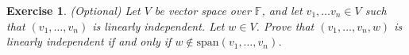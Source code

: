 \documentclass{article}
\theoremstyle{plain}
\newtheorem{Q}{Exercise}{\bfseries}{\upshape}
\newcommand{\bF}{\mathbb{F}}
\newcommand{\spa}{\mathrm{span}}
\begin{document}
\begin{Q}(Optional)
Let $V$ be vector space over $\bF$, and let $v_1,\ldots v_n\in V$ such that $(v_1,\ldots,v_n)$ is linearly independent. Let $w\in V$. Prove that $(v_1,\ldots,v_n, w)$ is linearly independent if and only if $w\not\in \spa(v_1,\ldots,v_n)$.
\end{Q}
\begin{comment}
\textbf{Solution:}
If $w\in \spa(v_1,\ldots,v_n)$, then $w = a_1v_1+\ldots +a_n v_n$ for some $a_1,\ldots,a_n$, and so $0 = (-1)w + a_1v_1+\ldots +a_n v_n$, and so $(v_1,\ldots,v_n, w)$ is not linearly independent. Conversely, if $(v_1,\ldots,v_n, w)$ is not linearly independent then we have $a_0w + a_1v_1+\ldots + a_n v_n = 0$ for some $a_0,\ldots, a_n$ not all zero, and $a_0$ cannot be zero, as $(v_1,\ldots,v_n)$ is linearly independent. So $w = \frac{-a_1}{a_0}v_1 + \ldots + \frac{-a_n}{a_0}v_n$, and is therefore in $\spa(v_1,\ldots,v_n)$. 
\end{comment}
\end{document}
